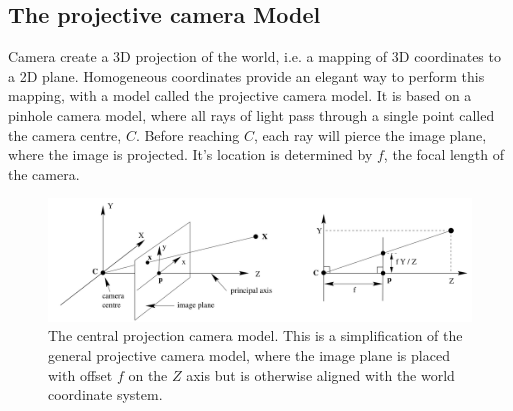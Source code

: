 \subsection{The projective camera Model}\label{camera-model}
Camera create a 3D projection of the world, i.e. a mapping of 3D coordinates to a 2D plane.
Homogeneous coordinates provide an elegant way to perform this mapping, with a model called the projective camera model.
It is based on a pinhole camera model, where all rays of light pass through a single point called the camera centre, $C$. Before reaching $C$, each ray will pierce the image plane, where the image is projected.
It's location is determined by $f$, the focal length of the camera.

\begin{figure}
\begin{center}
\includegraphics[width=1.0\textwidth]{figures/central_projection_camera.png}
\end{center}
\caption{The central projection camera model. This is a simplification of the general projective camera model, where the image plane is placed with offset $f$ on the $Z$ axis but is otherwise aligned with the world coordinate system.}
\label{fig:central_projection_camera} %
\end{figure}

